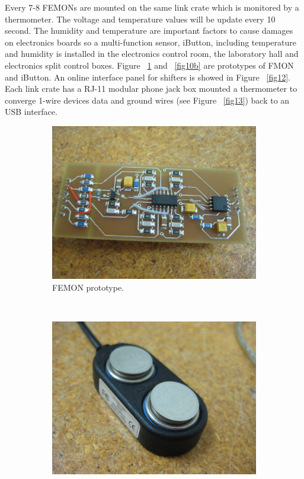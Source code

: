 \documentclass{JINST}
\begin{document}
Every 7-8 FEMONs are mounted on the same link crate which is monitored by a thermometer. The voltage and temperature values will be update every 10 second. The humidity and temperature are important factors to cause damages on electronics boards so a multi-function sensor, iButton\cite{bib9}, including temperature and humidity is installed in the electronics control room, the laboratory hall and electronics split control boxes. Figure ~\ref{fig10a} and ~\ref{fig10b} are prototypes of FMON and iButton. An online interface panel for shifters is showed in Figure ~\ref{fig12}. Each link crate has a RJ-11 modular phone jack box mounted a thermometer to converge 1-wire devices data and ground wires (see Figure ~\ref{fig13}) back to an USB interface.


\begin{figure}
        \centering
        \begin{subfigure}[b]{0.5\textwidth}
                \centering
                \includegraphics[width=\textwidth]{IMG_3544.JPG}
                \caption{FEMON prototype.}
                \label{fig10a}
        \end{subfigure}%
        ~ %
        \begin{subfigure}[b]{0.5\textwidth}
                \centering
                \includegraphics[width=\textwidth]{IMG_3542.JPG}

\end{subfigure}
\end{figure}
\end{document}
